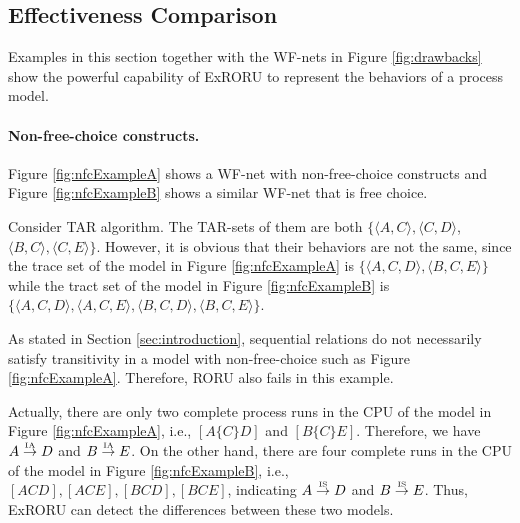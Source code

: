 \documentclass{llncs}
\begin{document}
\subsection{Effectiveness Comparison}\label{subsec:effectiveness}
Examples in this section together with the WF-nets in Figure \ref{fig:drawbacks} show the powerful capability of ExRORU to represent the behaviors of a process model.

\paragraph{\textbf{Non-free-choice constructs.}}\label{par:nfc} 
Figure \ref{fig:nfcExampleA} shows a WF-net with non-free-choice constructs \cite{de2003workflow} and Figure \ref{fig:nfcExampleB} shows a similar WF-net that is free choice.

Consider TAR algorithm. The TAR-sets of them are both $\{\langle A,C\rangle, \langle C,D\rangle$, $\langle B,C\rangle, \langle C,E\rangle\}$. However, it is obvious that their behaviors are not the same, since the trace set of the model in Figure \ref{fig:nfcExampleA} is $\{\langle A,C,D\rangle,\langle B,C,E\rangle\}$ while the tract set of the model in Figure \ref{fig:nfcExampleB} is $\{\langle A,C,D\rangle,\langle A,C,E\rangle,\langle B,C,D\rangle,\langle B,C,E\rangle\}$.

As stated in Section \ref{sec:introduction}, sequential relations do not necessarily satisfy transitivity in a model with non-free-choice such as Figure \ref{fig:nfcExampleA}. Therefore, RORU also fails in this example.

Actually, there are only two complete process runs in the CPU of the model in Figure \ref{fig:nfcExampleA}, i.e., $[A\{C\}D]$ and $[B\{C\}E]$. Therefore, we have $A\overset{\text{\tiny{IA}}}{\rightarrow}D$ and $B\overset{\text{\tiny{IA}}}{\rightarrow}E$. On the other hand, there are four complete runs in the CPU of the model in Figure \ref{fig:nfcExampleB}, i.e., $[ACD],[ACE],[BCD],[BCE]$, indicating $A\overset{\text{\tiny{IS}}}{\rightarrow}D$ and $B\overset{\text{\tiny{IS}}}{\rightarrow}E$. Thus, ExRORU can detect the differences between these two models.
\end{document}
